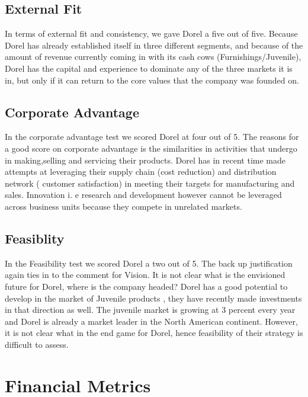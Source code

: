 {\subsection{External Fit}
In terms of  external fit and consistency, we gave Dorel a five out of five.  Because Dorel has already established itself in three different segments, and because of the amount of revenue currently coming in with its cash cows (Furnishings/Juvenile), Dorel has the capital and experience to dominate any of the three markets it is in, but only if it can return to the core values that the company was founded on.

\subsection{Corporate Advantage}
In the corporate advantage test we scored Dorel at four out of 5. The reasons for a good score on corporate advantage is the similarities in activities that undergo in making,selling and servicing their products. Dorel has in recent time made attempts at leveraging their supply chain (cost reduction) and distribution network ( customer satisfaction) in meeting their targets for manufacturing and sales. Innovation i. e  research and development however cannot be leveraged across business units because they compete in unrelated markets.

\subsection{Feasiblity}
In the Feasibility test we scored Dorel a two out of 5. The back up justification again ties in to the comment for Vision. It is not clear what is the envisioned future for Dorel, where is the company headed? Dorel has a good potential to develop in the market of Juvenile products , they have recently made investments in that direction as well. The juvenile market is growing at 3 percent every year and Dorel is already a market leader in the North American continent. However, it is not clear what in the end game for Dorel, hence feasibility of their strategy is difficult to assess.

\section{Financial Metrics}
\label{chp:financials}
}
